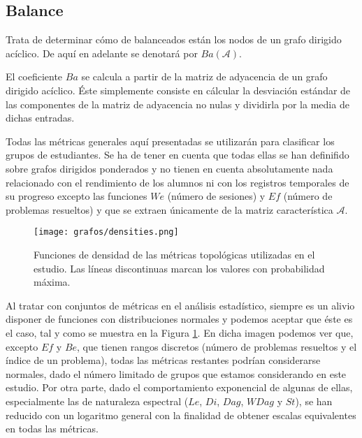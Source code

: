 \subsection{Balance}

Trata de determinar cómo de balanceados están los nodos de un grafo dirigido acíclico. De aquí en adelante se denotará por $Ba(\mathcal{A})$.

El coeficiente $Ba$ se calcula a partir de la matriz de adyacencia de un grafo dirigido acíclico. Éste simplemente consiste en cálcular la desviación estándar de las componentes de la matriz de adyacencia no nulas y dividirla por la media de dichas entradas.

Todas las métricas generales aquí presentadas se utilizarán para clasificar los grupos de estudiantes. Se ha de tener en cuenta que todas ellas se han definifido sobre grafos dirigidos ponderados y no tienen en cuenta absolutamente nada relacionado con el rendimiento de los alumnos ni con los registros temporales de su progreso excepto las funciones $We$ (número de sesiones) y $Ef$ (número de problemas resueltos) y que se extraen únicamente de la matriz característica $\mathcal{A}$.

\begin{figure}[H]
    \centering
    \texttt{[image: grafos/densities.png]}
    \caption{Funciones de densidad de las métricas topológicas utilizadas en el estudio. Las líneas discontinuas marcan los valores con probabilidad máxima.}
    \label{fig:densities}
\end{figure}

Al tratar con conjuntos de métricas en el análisis estadístico, siempre es un alivio disponer de funciones con distribuciones normales y podemos aceptar que éste es el caso, tal y como se muestra en la Figura \ref{fig:densities}. En dicha imagen podemos ver que, excepto $Ef$ y $Be$, que tienen rangos discretos (número de problemas resueltos y el índice de un problema), todas las métricas restantes podrían considerarse normales, dado el número limitado de grupos que estamos considerando en este estudio. Por otra parte, dado el comportamiento exponencial de algunas de ellas, especialmente las de naturaleza espectral ($Le$, $Di$, $Dag$, $WDag$ y $St$), se han reducido con un logaritmo general con la finalidad de obtener escalas equivalentes en todas las métricas.